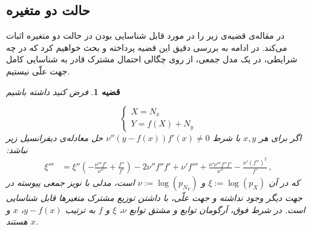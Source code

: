 \documentclass[a4paper,12pt]{article}
\newtheorem{thm}{{\large\bf قضیه}}[section]
\begin{document}
\subsection{حالت دو متغیره}
در مقاله‌ی 
\cite{hoyer}
قضیه‌ی زیر را در مورد قابل شناسایی بودن 
در حالت دو متغیره اثبات می‌کند. در ادامه به بررسی دقیق این قضیه پرداخته و بحث خواهیم کرد که در چه شرایطی، در یک مدل جمعی، از روی چگالی احتمال مشترک قادر به شناسایی کامل جهت علّی نیستیم.
\begin{thm} \label{hoyer}
	فرض کنید داشته باشیم
	
	\begin{equation*}
	\begin{cases}
	X = N_x\\
	Y = f(X) + N_y
	\end{cases}
	\end{equation*}
	اگر برای هر 
	$x, y$ 
	با شرط
	$\nu''(y-f(x))f'(x)\neq 0$ 
	حل معادله‌ی دیفرانسیل زیر نباشد:
	\begin{align}\label{DGL}
	\xi'''&=   \xi''  \left(-\frac{\nu'''f'}{\nu''}
	+\frac{f''}{f'}\right) 
	-2 \nu''f''f' %
	+\nu'f'''+\frac{\nu'\nu'''f''f'}{\nu''}-\frac{\nu'(f'')^2}{f'}\,,
	\end{align}
	که در آن 
	$\xi := \log(p_X)$ 
	و
	$\nu := \log(p_{N_{Y}})$
	است، مدلی با نویز جمعی پیوسته در جهت دیگر وجود نداشته و جهت علّی، با داشتن توزیع مشترک متغیر‌ها قابل شناسایی است. در شرط فوق، آرگومان توابع و مشتق توابع $\nu$، 
	$\xi $
	و $f$ به ترتیب 
	$y-f(x)$،
	$x$
	و  
	$x$
	هستند.
\end{thm}
\vspace{0.5cm}
\end{document}
